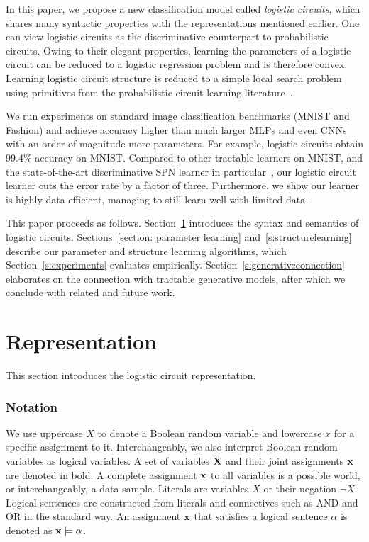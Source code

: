\documentclass[letterpaper]{article} %
\begin{document}
In this paper, we propose a new classification model called \emph{logistic circuits}, which shares many syntactic properties with the representations mentioned earlier. One can view logistic circuits as the discriminative counterpart to probabilistic circuits. Owing to their elegant properties, learning the parameters of a logistic circuit can be reduced to a logistic regression problem and is therefore convex.
Learning logistic circuit structure is reduced to a simple local search problem using primitives from the probabilistic circuit learning literature~\cite{Liang2017}.

We run experiments on standard image classification benchmarks (MNIST and Fashion) and achieve accuracy higher than much larger MLPs and even CNNs with an order of magnitude more parameters. For example, logistic circuits obtain 99.4\% accuracy on MNIST.
Compared to other tractable learners on MNIST, and the state-of-the-art discriminative SPN learner in particular~\cite{rat-spn2018}, our logistic circuit learner cuts the error rate by a factor of three.
Furthermore, we show our learner is highly data efficient, managing to still learn well with limited data.

This paper proceeds as follows.
Section~\ref{s:representation} introduces the syntax and semantics of logistic circuits.
Sections~\ref{section: parameter learning} and~\ref{s:structurelearning} describe our parameter and structure learning algorithms, which Section~\ref{s:experiments} evaluates empirically.
Section~\ref{s:generativeconnection} elaborates on the connection with tractable generative models, after which we conclude with related and future work.


\section{Representation} \label{s:representation}
This section introduces the logistic circuit representation.

\subsubsection*{Notation}
We use uppercase $X$ to denote a Boolean random variable and lowercase $x$ for a specific assignment to it. Interchangeably, we also interpret Boolean random variables as logical variables. A set of variables $\bf X$ and their joint assignments $\bf x$ are denoted in bold. A complete assignment $\bf x$ to all variables is a possible world, or interchangeably, a data sample. Literals are variables $X$ or their negation $\neg X$. Logical sentences are constructed from literals and connectives such as AND and OR in the standard way. An assignment $\bf x$ that satisfies a logical sentence $\alpha$ is denoted as ${\bf x} \models \alpha$.
\end{document}
